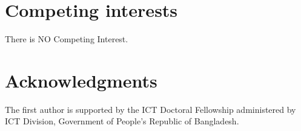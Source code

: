 \documentclass[unnumsec,webpdf,modern,large]{oup-authoring-template}
\theoremstyle{thmstyleone}%
\theoremstyle{thmstyletwo}%
\theoremstyle{thmstylethree}%
\begin{document}
 




%
\section{Competing interests}
There is NO Competing Interest.


%

\section{Acknowledgments}
The first author is supported by the ICT Doctoral Fellowship administered by ICT Division, Government of People’s Republic of Bangladesh.




\end{document}
